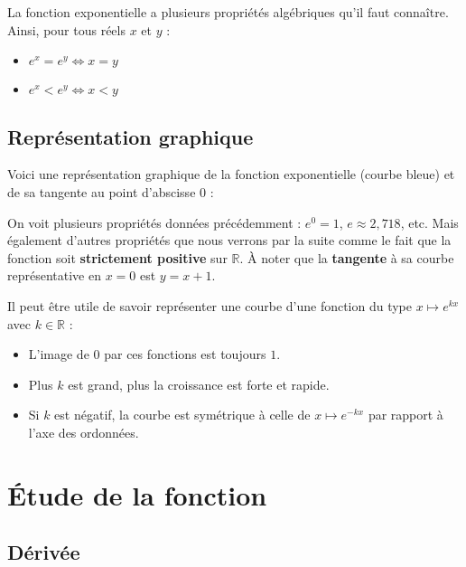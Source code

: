 	\begin{formula}
		La fonction exponentielle a plusieurs propriétés algébriques qu'il faut connaître. Ainsi, pour tous réels $x$ et $y$ :
		\begin{itemize}
			\item $e^x = e^y \iff x = y$
			\item $e^x < e^y \iff x < y$
		\end{itemize}
	\end{formula}
	
	\subsection{Représentation graphique}
	
	Voici une représentation graphique de la fonction exponentielle (courbe bleue) et de sa tangente au point d'abscisse $0$ :
	
	
	On voit plusieurs propriétés données précédemment : $e^0 = 1$, $e \approx 2,718$, etc. Mais également d'autres propriétés que nous verrons par la suite comme le fait que la fonction soit \textbf{strictement positive} sur $\mathbb{R}$. À noter que la \textbf{tangente} à sa courbe représentative en $x = 0$ est $y = x + 1$.
	
	\begin{tip}
		Il peut être utile de savoir représenter une courbe d'une fonction du type $x \mapsto e^{kx}$ avec $k \in \mathbb{R}$ :
		\begin{itemize}
			\item L'image de $0$ par ces fonctions est toujours $1$.
			\item Plus $k$ est grand, plus la croissance est forte et rapide.
			\item Si $k$ est négatif, la courbe est symétrique à celle de $x \mapsto e^{-kx}$ par rapport à l'axe des ordonnées.
		\end{itemize}
	\end{tip}
	
	\section{Étude de la fonction}
	
	\subsection{Dérivée}
	
